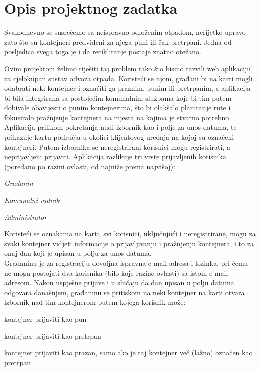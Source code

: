 \chapter{Opis projektnog zadatka}



Svakodnevno se susrećemo sa neispravno odloženim otpadom, nerijetko upravo zato što su kontejneri predviđeni za njega puni ili čak pretrpani. Jedna od posljedica svega toga je i da recikliranje postaje znatno otežano. 

Ovim projektom želimo riješiti taj problem tako što bismo razvili web aplikaciju za cjelokupan sustav odvoza otpada. Koristeći se njom, građani bi na karti mogli odabrati neki kontejner i označiti ga praznim, punim ili pretrpanim, a aplikacija bi bila integrirana sa postojećim komunalnim službama koje bi tim putem dobivale obavijesti o punim kontejnerima, što bi olakšalo planiranje rute i fokusiralo pražnjenje kontejnera na mjesta na kojima je stvarno potrebno.\\

Aplikacija prilikom pokretanja nudi izbornik kao i polje za unos datuma, te prikazuje kartu područja u okolici klijentovog uređaja na kojoj su označeni kontejneri. Putem izbornika se neregistrirani korisnici mogu registrirati, a neprijavljeni prijaviti. Aplikacija razlikuje tri vrste prijavljenih korisnika (poredano po razini ovlasti, od najniže prema najvišoj):
\begin{packed_item}
	\item \textit{Građanin}
	\item \textit{Komunalni radnik}
	\item \textit{Administrator}
\end{packed_item}

Koristeći se oznakama na karti, svi korisnici, uključujući i neregistrirane, mogu za svaki kontejner vidjeti informacije o prijavljivanju i pražnjenju kontejnera, i to za onaj dan koji je upisan u polju za unos datuma.\\

Građaninu je za registraciju dovoljna ispravna e-mail adresa i lozinka, pri čemu ne mogu postojati dva korisnika (bilo koje razine ovlasti) sa istom e-mail adresom. 
Nakon uspješne prijave i u slučaju da dan upisan u polju datuma odgovara današnjem, građaninu se pritiskom na neki kontejner na karti otvara izbornik nad tim kontejnerom putem kojega korisnik može:
\begin{packed_item}
	\item kontejner prijaviti kao pun
	\item kontejner prijaviti kao pretrpan
	\item kontejner prijaviti kao prazan, samo ako je taj kontejner već (lažno) označen kao pretrpan
\end{packed_item}

